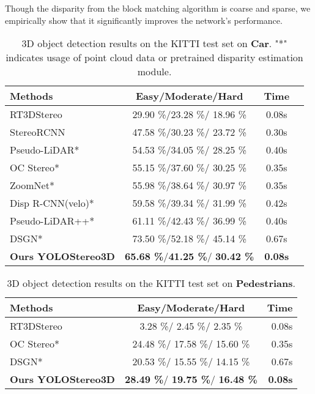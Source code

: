 \documentclass[letterpaper, 10 pt, conference]{ieeeconf}
\begin{document}
Though the disparity from the block matching algorithm is coarse and sparse, we empirically show that it significantly improves the network's performance.
\begin{table}
    \centering
    \caption{3D object detection results on the KITTI test set on \textbf{Car}.   "*" indicates usage of point cloud data or pretrained disparity estimation module.}
    \begin{tabular*}{0.46\textwidth}{ |l|c|c|r|}
        \hline
        {\bf Methods} & {\bf Easy/Moderate/Hard}  & {\bf Time}  \\ \hline
        RT3DStereo\cite{Hendrik2019RT3DStereo}       &29.90 \%/23.28 \%/ 18.96 \%& 0.08s\\
        StereoRCNN\cite{Li2019Stereo}                &47.58 \%/30.23 \%/ 23.72 \%&0.30s\\
        Pseudo-LiDAR*\cite{Weng2019Plidar}           &54.53 \%/34.05 \%/ 28.25 \%&0.40s\\
        OC Stereo*\cite{Pon2019OCStereo}             &55.15 \%/37.60 \%/ 30.25 \%&  0.35s\\
        ZoomNet*\cite{xu2020Zoomnet}                 &55.98 \%/38.64 \%/ 30.97 \%&  0.35s\\
        Disp R-CNN(velo)*\cite{Sun2020DispRCNN}      &59.58 \%/39.34 \%/ 31.99 \%&  0.42s\\
        Pseudo-LiDAR++*\cite{You2019PLPP}            &61.11 \%/42.43 \%/ 36.99 \%&  0.40s\\
        DSGN*\cite{Chen2020DSGN}                     &73.50 \%/52.18 \%/ 45.14 \%&  0.67s\\
        \hline 
        \textbf{Ours YOLOStereo3D}  & \textbf{65.68 \%}/\textbf{41.25 \%}/ \textbf{30.42 \%}& \textbf{0.08s}\\
        \hline
    \end{tabular*}
    
    \label{tab:test_results}
\end{table}

\begin{table}
    \centering
    \caption{3D object detection results on the KITTI test set on \textbf{Pedestrians}.}
    \begin{tabular*}{0.462\textwidth}{ |l|c|r|}
        \hline
        {\bf Methods} & {\bf Easy/Moderate/Hard} & {\bf Time}  \\ \hline
        RT3DStereo\cite{Hendrik2019RT3DStereo}       &  3.28 \%/  2.45 \%/  2.35 \%& 0.08s\\
        OC Stereo*\cite{Pon2019OCStereo}             & 24.48 \%/ 17.58 \%/ 15.60 \%& 0.35s\\
        DSGN*\cite{Chen2020DSGN}                     & 20.53 \%/ 15.55 \%/ 14.15 \%& 0.67s\\
        \hline 
        \textbf{Ours YOLOStereo3D}  &  \textbf{28.49 \%}/ \textbf{19.75 \%}/ \textbf{16.48 \%}& \textbf{0.08s}\\
        \hline
    \end{tabular*}
    
    \label{tab:test_ped_results}
\end{table}
 
\end{document}
